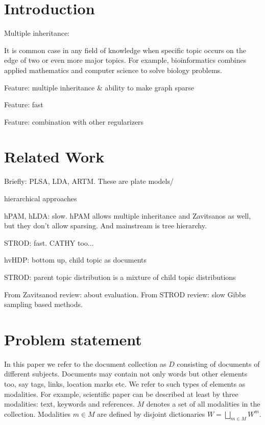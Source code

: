 \documentclass[12pt, twoside]{article}
\begin{document}

\maketitle
\linenumbers

\newcommand{\norm}{\mathop{\text{norm}}}

\section{Introduction}
\noindent %
Multiple inheritance:

It is common case in any field of knowledge when specific topic occurs on the edge of two or even more major topics. For example, bioinformatics combines applied mathematics and computer science to solve biology problems. 

Feature: multiple inheritance \& ability to make graph sparse

Feature: fast

Feature: combination with other regularizers

\section{Related Work}
Briefly: PLSA, LDA, ARTM. These are plate models/

hierarchical approaches

hPAM, hLDA: slow. hPAM allows multiple inheritance and Zavitsanos as well, but they don't allow sparsing. And mainstream is tree hierarchy.

STROD: fast. CATHY too...

hvHDP: bottom up, child topic as documents

STROD: parent topic distribution is a mixture of child topic distributions

From Zavitsanod review: about evaluation.
From STROD review: slow Gibbs sampling based methods.

\section{Problem statement}
In this paper we refer to the document collection as $D$ consisting of documents of different subjects.
Documents may contain not only words but other elements too, say tags, links, location marks etc. We refer to such types of elements as modalities. For example, scientific paper can be described at least by three modalities: text, keywords and references. $M$ denotes a set of all modalities in the collection. Modalities $m \in M$ are defined by disjoint dictionaries $W = \bigsqcup_{m \in M} W^m$. 
\end{document}
